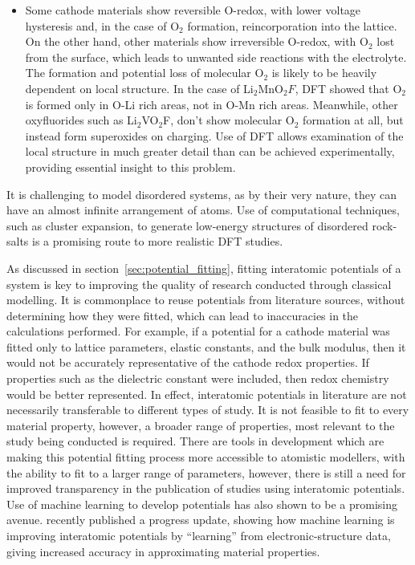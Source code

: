 \documentclass[../main.tex]{subfiles}
\begin{document}
\begin{itemize}
    \item Some cathode materials show reversible O-redox, with lower voltage hysteresis and, in the case of O$_2$ formation, reincorporation into the lattice.\cite{Sharpe2020} On the other hand, other materials show irreversible O-redox, with O$_2$ lost from the surface, \cite{Nakayama2020, Chen2016, House2020a} which leads to unwanted side reactions with the electrolyte. The formation and potential loss of molecular O$_2$ is likely to be heavily dependent on local structure. In the case of Li$_2$MnO$_2F$, DFT showed that O$_2$ is formed only in O-Li rich areas, not in O-Mn rich areas.\cite{Sharpe2020} Meanwhile, other oxyfluorides such as Li$_2$VO$_2$F, don’t show molecular O$_2$ formation at all, but instead form superoxides on charging.\cite{Chang2020} Use of DFT allows examination of the local structure in much greater detail than can be achieved experimentally, providing essential insight to this problem.
\end{itemize}

It is challenging to model disordered systems, as by their very nature, they can have an almost infinite arrangement of atoms. Use of computational techniques, such as cluster expansion, to generate low-energy structures of disordered rock-salts is a promising route to more realistic DFT studies.\cite{Lun2020}

As discussed in section~\ref{sec:potential_fitting}, fitting interatomic potentials of a system is key to improving the quality of research conducted through classical modelling. It is commonplace to reuse potentials from literature sources, without determining how they were fitted, which can lead to inaccuracies in the calculations performed. For example, if a potential for a cathode material was fitted only to lattice parameters, elastic constants, and the bulk modulus, then it would not be accurately representative of the cathode redox properties. If properties such as the dielectric constant were included, then redox chemistry would be better represented. In effect, interatomic potentials in literature are not necessarily transferable to different types of study. It is not feasible to fit to every material property, however, a broader range of properties, most relevant to the study being conducted is required. There are tools in development \cite{gale_empirical_1996,Stukowski_2017,wen_kim-compliant_2017, Morgan2020BuckFit} which are making this potential fitting process more accessible to atomistic modellers, with the ability to fit to a larger range of parameters, however, there is still a need for improved transparency in the publication of studies using interatomic potentials. Use of machine learning to develop potentials has also shown to be a promising avenue. \citeauthor{deringer2019machine} recently published a progress update, showing how machine learning is improving interatomic potentials by ``learning'' from electronic-structure data, giving increased accuracy in approximating material properties. \cite{deringer2019machine}
\end{document}
